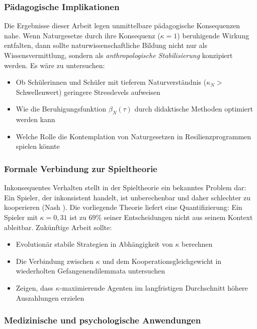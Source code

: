 ﻿\documentclass[a4paper,12pt]{article}
\theoremstyle{definition}
\begin{document}
\subsubsection{Pädagogische Implikationen}

Die Ergebnisse dieser Arbeit legen unmittelbare pädagogische Konsequenzen nahe. Wenn Naturgesetze durch ihre Konsequenz ($\kappa = 1$) beruhigende Wirkung entfalten, dann sollte naturwissenschaftliche Bildung nicht nur als Wissensvermittlung, sondern als \emph{anthropologische Stabilisierung} konzipiert werden. Es wäre zu untersuchen:
\begin{itemize}
\item Ob Schülerinnen und Schüler mit tieferem Naturverständnis ($\kappa_N > $ Schwellenwert) geringere Stresslevels aufweisen
\item Wie die Beruhigungsfunktion $\beta_N(\tau)$ durch didaktische Methoden optimiert werden kann
\item Welche Rolle die Kontemplation von Naturgesetzen in Resilienzprogrammen spielen könnte
\end{itemize}

\subsubsection{Formale Verbindung zur Spieltheorie}

Inkonsequentes Verhalten stellt in der Spieltheorie ein bekanntes Problem dar: Ein Spieler, der inkonsistent handelt, ist unberechenbar und daher schlechter zu kooperieren (Nash \cite{nash1951}). Die vorliegende Theorie liefert eine Quantifizierung: Ein Spieler mit $\kappa = 0{,}31$ ist zu $69\%$ seiner Entscheidungen nicht aus seinem Kontext ableitbar. Zukünftige Arbeit sollte:
\begin{itemize}
\item Evolutionär stabile Strategien in Abhängigkeit von $\kappa$ berechnen
\item Die Verbindung zwischen $\kappa$ und dem Kooperationsgleichgewicht in wiederholten Gefangenendilemmata untersuchen
\item Zeigen, dass $\kappa$-maximierende Agenten im langfristigen Durchschnitt höhere Auszahlungen erzielen
\end{itemize}

\subsubsection{Medizinische und psychologische Anwendungen}
\end{document}
